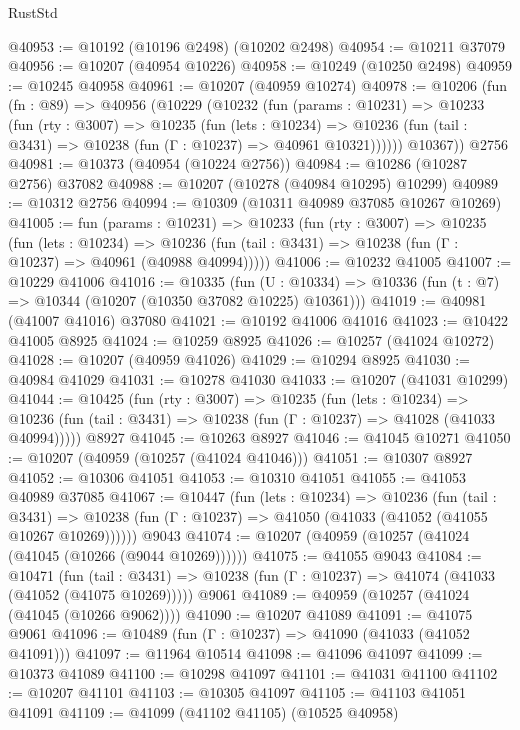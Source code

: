 \begin{lexlean}{RustStd}
\begin{coremodule}
@40953 := @10192 (@10196 @2498) (@10202 @2498)
@40954 := @10211 @37079
@40956 := @10207 (@40954 @10226)
@40958 := @10249 (@10250 @2498)
@40959 := @10245 @40958
@40961 := @10207 (@40959 @10274)
@40978 := @10206
    (fun (fn : @89) =>
    @40956
      (@10229
        (@10232
          (fun (params : @10231) =>
          @10233
            (fun (rty : @3007) =>
            @10235
              (fun (lets : @10234) =>
              @10236 (fun (tail : @3431) => @10238 (fun (Γ : @10237) => @40961 @10321))))))
        @10367))
    @2756
@40981 := @10373 (@40954 (@10224 @2756))
@40984 := @10286 (@10287 @2756) @37082
@40988 := @10207 (@10278 (@40984 @10295) @10299)
@40989 := @10312 @2756
@40994 := @10309 (@10311 @40989 @37085 @10267 @10269)
@41005 := fun (params : @10231) =>
  @10233
    (fun (rty : @3007) =>
    @10235
      (fun (lets : @10234) =>
      @10236 (fun (tail : @3431) => @10238 (fun (Γ : @10237) => @40961 (@40988 @40994)))))
@41006 := @10232 @41005
@41007 := @10229 @41006
@41016 := @10335
    (fun (U : @10334) => @10336 (fun (t : @7) => @10344 (@10207 (@10350 @37082 @10225) @10361)))
@41019 := @40981 (@41007 @41016) @37080
@41021 := @10192 @41006 @41016
@41023 := @10422 @41005 @8925
@41024 := @10259 @8925
@41026 := @10257 (@41024 @10272)
@41028 := @10207 (@40959 @41026)
@41029 := @10294 @8925
@41030 := @40984 @41029
@41031 := @10278 @41030
@41033 := @10207 (@41031 @10299)
@41044 := @10425
    (fun (rty : @3007) =>
    @10235
      (fun (lets : @10234) =>
      @10236 (fun (tail : @3431) => @10238 (fun (Γ : @10237) => @41028 (@41033 @40994)))))
    @8927
@41045 := @10263 @8927
@41046 := @41045 @10271
@41050 := @10207 (@40959 (@10257 (@41024 @41046)))
@41051 := @10307 @8927
@41052 := @10306 @41051
@41053 := @10310 @41051
@41055 := @41053 @40989 @37085
@41067 := @10447
    (fun (lets : @10234) =>
    @10236
      (fun (tail : @3431) =>
      @10238 (fun (Γ : @10237) => @41050 (@41033 (@41052 (@41055 @10267 @10269))))))
    @9043
@41074 := @10207 (@40959 (@10257 (@41024 (@41045 (@10266 (@9044 @10269))))))
@41075 := @41055 @9043
@41084 := @10471
    (fun (tail : @3431) => @10238 (fun (Γ : @10237) => @41074 (@41033 (@41052 (@41075 @10269)))))
    @9061
@41089 := @40959 (@10257 (@41024 (@41045 (@10266 @9062))))
@41090 := @10207 @41089
@41091 := @41075 @9061
@41096 := @10489 (fun (Γ : @10237) => @41090 (@41033 (@41052 @41091)))
@41097 := @11964 @10514
@41098 := @41096 @41097
@41099 := @10373 @41089
@41100 := @10298 @41097
@41101 := @41031 @41100
@41102 := @10207 @41101
@41103 := @10305 @41097
@41105 := @41103 @41051 @41091
@41109 := @41099 (@41102 @41105) (@10525 @40958)

\end{coremodule}
\end{lexlean}
